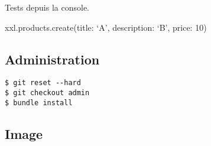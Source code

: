 Tests depuis la console.

\begin{otherlanguage}{english}

\begin{Shaded}
\begin{Highlighting}[]
\NormalTok{$ }
\OperatorTok{>} \NormalTok{)}
\OperatorTok{>} 
\NormalTok{=}\OperatorTok{>} 
\end{Highlighting}
\end{Shaded}

\end{otherlanguage}

xxl.products.create(title: `A', description: `B', price: 10)

\hypertarget{administration}{%
\subsection{Administration}\label{administration}}

\begin{otherlanguage}{english}

\begin{Shaded}
\begin{Highlighting}[]
\NormalTok{$ }

 \NormalTok{, }

\NormalTok{$ }
\NormalTok{$ }
\NormalTok{$ }
\end{Highlighting}
\end{Shaded}

\end{otherlanguage}

\begin{otherlanguage}{english}

\begin{verbatim}
$ git reset --hard
$ git checkout admin
$ bundle install
\end{verbatim}

\end{otherlanguage}

\hypertarget{image}{%
\subsection{Image}\label{image}}

